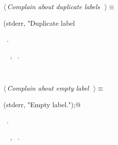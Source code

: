 \documentclass{report}
\begin{document}
\begin{flushleft} \small
\begin{minipage}{\linewidth} \label{scrap249}
$\langle\,${\it Complain about duplicate labels}\nobreak\ {\footnotesize {}}$\,\rangle\equiv$
\vspace{-1ex}
\begin{list}{}{} \item
\mbox{}\verb@fprintf(stderr, "Duplicate label %s.\n", label_name);@{\NWsep}
\end{list}
\vspace{-1ex}
\footnotesize\addtolength{\baselineskip}{-1ex}
\begin{list}{}{\setlength{\itemsep}{-\parsep}\setlength{\itemindent}{-\leftmargin}}
\item \NWtxtMacroRefIn\ .
\end{list}
\vspace{-2ex}
\footnotesize\addtolength{\baselineskip}{-1ex}
\begin{list}{}{\setlength{\itemsep}{-\parsep}\setlength{\itemindent}{-\leftmargin}}
\item \NWtxtIdentsUsed\nobreak\  \verb@fprintf@\nobreak\ , \verb@stderr@\nobreak\ .\end{list}
\end{minipage}\\[4ex]
\end{flushleft}
\begin{flushleft} \small
\begin{minipage}{\linewidth} \label{scrap250}
$\langle\,${\it Complain about empty label}\nobreak\ {\footnotesize {}}$\,\rangle\equiv$
\vspace{-1ex}
\begin{list}{}{} \item
\mbox{}\verb@fprintf(stderr, "Empty label.\n");@{\NWsep}
\end{list}
\vspace{-1ex}
\footnotesize\addtolength{\baselineskip}{-1ex}
\begin{list}{}{\setlength{\itemsep}{-\parsep}\setlength{\itemindent}{-\leftmargin}}
\item \NWtxtMacroRefIn\ .
\end{list}
\vspace{-2ex}
\footnotesize\addtolength{\baselineskip}{-1ex}
\begin{list}{}{\setlength{\itemsep}{-\parsep}\setlength{\itemindent}{-\leftmargin}}
\item \NWtxtIdentsUsed\nobreak\  \verb@fprintf@\nobreak\ , \verb@stderr@\nobreak\ .\end{list}
\end{minipage}\\[4ex]
\end{flushleft}
\end{document}
